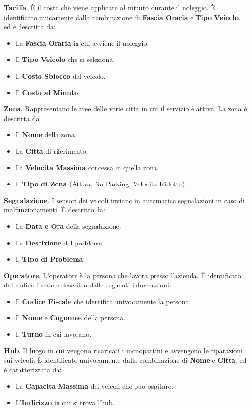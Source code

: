 \documentclass[11pt,a4paper]{article}
\begin{document}
\textbf{Tariffa}.
È il costo che viene applicato al minuto durante il noleggio. È identificato
unicamente dalla combinazione di \textbf{Fascia Oraria} e \textbf{Tipo Veicolo},
ed è descritta da:
\begin{itemize}
    \item La \textbf{Fascia Oraria} in cui avviene il noleggio.
    \item Il \textbf{Tipo Veicolo} che si seleziona.
    \item Il \textbf{Costo Sblocco} del veicolo.
    \item Il \textbf{Costo al Minuto}.
\end{itemize}

\textbf{Zona}.
Rappresentano le aree delle varie citta in cui il servizio è attivo.
La zona è descritta da:
\begin{itemize}
    \item Il \textbf{Nome} della zona.
    \item La \textbf{Citta} di riferimento.
    \item La \textbf{Velocita Massima} concessa in quella zona.
    \item Il \textbf{Tipo di Zona} (Attiva, No Parking, Velocita Ridotta).
\end{itemize}

\textbf{Segnalazione}.
I sensori dei veicoli inviano in automatico segnalazioni in caso di malfunzionamenti.
È descritto da:
\begin{itemize}
    \item La \textbf{Data e Ora} della segnalazione.
    \item La \textbf{Descizione} del problema.
    \item Il \textbf{Tipo di Problema}.
\end{itemize}

\textbf{Operatore}.
L'operatore è la persona che lavora presso l'azienda.
È identificato dal codice fiscale e descritto dalle seguenti informazioni:
\begin{itemize}
    \item Il \textbf{Codice Fiscale} che identifica univocamente la persona.
    \item Il \textbf{Nome} e \textbf{Cognome} della persona.
    \item Il \textbf{Turno} in cui lavorano.
\end{itemize}

\textbf{Hub}. Il luogo in cui vengono ricaricati i monopattini e avvengono le riparazioni sui veicoli.
È identificato univocamente dalla
combinazione di \textbf{Nome} e \textbf{Citta}, ed è caratterizzata da:
\begin{itemize}
    \item La \textbf{Capacita Massima} dei veicoli che puo ospitare.
    \item L'\textbf{Indirizzo} in cui si trova l'hub.
\end{itemize}
\end{document}
